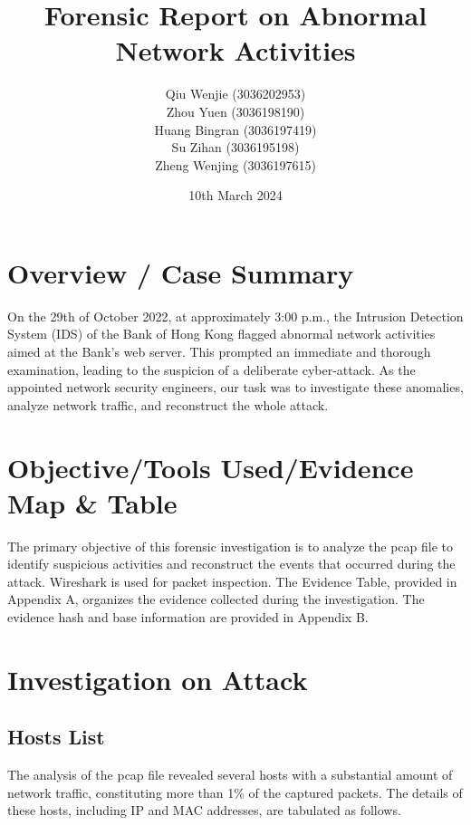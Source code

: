 \documentclass{article}
\title{\fontsize{16pt}{19pt}\selectfont\textbf{Forensic Report on Abnormal Network Activities}}
\author{\fontsize{12pt}{14pt}\selectfont Qiu Wenjie (3036202953) \\ Zhou Yuen (3036198190) \\ Huang Bingran (3036197419) \\ Su Zihan (3036195198) \\ Zheng Wenjing (3036197615)}
\date{\fontsize{12pt}{14pt}\selectfont 10th March 2024}
\begin{document}
    \maketitle

    \section{\fontsize{14pt}{17pt}\selectfont Overview / Case Summary}\label{sec:selectfont-overview-/-case-summary}
    On the 29th of October 2022, at approximately 3:00 p.m.,
    the Intrusion Detection System (IDS) of the Bank of Hong Kong flagged abnormal network activities aimed at the Bank's web server.
    This prompted an immediate and thorough examination,
    leading to the suspicion of a deliberate cyber-attack.
    As the appointed network security engineers, our task was to investigate these anomalies,
    analyze network traffic, and reconstruct the whole attack.

    \section{\fontsize{14pt}{17pt}\selectfont Objective/Tools Used/Evidence Map \& Table}\label{sec:selectfont-objective/tools-used/evidence-map-&-table}
    The primary objective of this forensic investigation is to analyze the pcap file to identify suspicious activities
    and reconstruct the events that occurred during the attack.
    Wireshark is used for packet inspection.
    The Evidence Table, provided in Appendix A, organizes the evidence collected during the investigation.
    The evidence hash and base information are provided in Appendix B.

    \section{\fontsize{14pt}{17pt}\selectfont Investigation on Attack}\label{sec:selectfont-investigation-on-attack}
    \subsection{Hosts List}\label{subsec:hosts-list}
    The analysis of the pcap file revealed several hosts with a substantial amount of network traffic,
    constituting more than 1\% of the captured packets.
    The details of these hosts, including IP and MAC addresses, are tabulated as follows.
\end{document}

